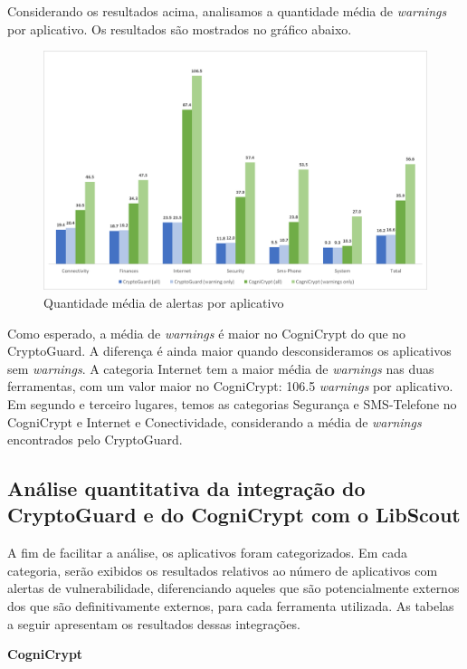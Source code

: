 Considerando os resultados acima, analisamos a quantidade média de \textit{warnings} por aplicativo. Os resultados são mostrados no gráfico abaixo.

\begin{figure}[!ht]
    \centering
    \includegraphics[scale=0.3]{img/averageWarnings.png}
    \caption{Quantidade média de alertas por aplicativo}
    \label{averageWarnings}
\end{figure}

Como esperado, a média de \textit{warnings} é maior no CogniCrypt do que no CryptoGuard. A diferença é ainda maior quando desconsideramos os aplicativos sem \textit{warnings}. A categoria Internet tem a maior média de \textit{warnings} nas duas ferramentas, com um valor maior no CogniCrypt: \num{106.5} \textit{warnings} por aplicativo. Em segundo e terceiro lugares, temos as categorias Segurança e SMS-Telefone no CogniCrypt e Internet e Conectividade, considerando a média de \textit{warnings} encontrados pelo CryptoGuard.

\subsection{Análise quantitativa da integração do CryptoGuard e do CogniCrypt com o LibScout}

A fim de facilitar a análise, os aplicativos foram categorizados. Em cada categoria, serão exibidos os resultados relativos ao número de aplicativos com alertas de vulnerabilidade, diferenciando aqueles que são potencialmente externos dos que são definitivamente externos, para cada ferramenta utilizada. As tabelas a seguir apresentam os resultados dessas integrações.

\textbf{CogniCrypt}


